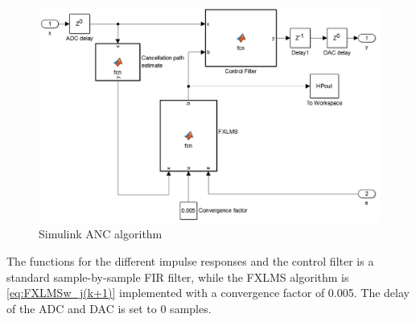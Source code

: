\begin{figure}[H]
	\centering
	\includegraphics[width=1\textwidth]{figures/BasicSystem/SimulinkANC}
	\caption{Simulink ANC algorithm}
	\label{fig:SimulinkANC}
\end{figure} 

The functions for the different impulse responses and the control filter is a standard sample-by-sample FIR filter, while the FXLMS algorithm is \autoref{eq:FXLMSw_j(k+1)} implemented with a convergence factor of 0.005. The delay of the ADC and DAC is set to 0 samples.



